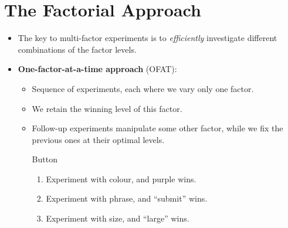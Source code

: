 \section{The Factorial Approach}
\begin{itemize}
      \item The key to multi-factor experiments is to \emph{efficiently} investigate different combinations of the factor
            levels.
      \item \textbf{One-factor-at-a-time approach} (OFAT):
            \begin{itemize}
                  \item Sequence of experiments, each where we vary only one factor.
                  \item We retain the winning level of this factor.
                  \item Follow-up experiments manipulate some other factor, while we fix the previous ones at
                        their optimal levels.
                        \begin{Example}{Button}{}
                              \begin{enumerate}[1.]
                                    \item Experiment with colour, and purple wins.
                                    \item Experiment with phrase, and ``submit'' wins.
                                    \item Experiment with size, and ``large'' wins.
                              \end{enumerate}
                        \end{Example}
            \end{itemize}
\end{itemize}
